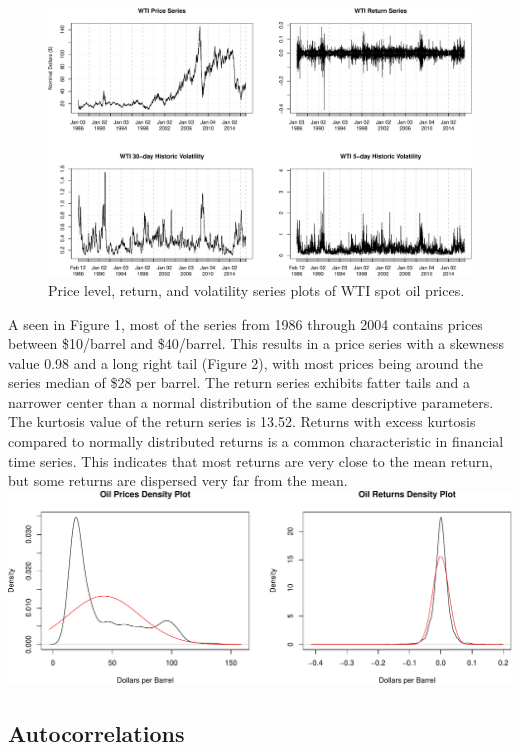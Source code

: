 \documentclass[]{article}
\begin{document}
\begin{figure}[htbp]
\centering
\includegraphics{Figs/unnamed-chunk-4-1.pdf}
\caption{Price level, return, and volatility series plots of WTI spot
oil prices.}
\end{figure}

A seen in Figure 1, most of the series from 1986 through 2004 contains
prices between \$10/barrel and \$40/barrel. This results in a price
series with a skewness value 0.98 and a long right tail (Figure 2), with
most prices being around the series median of \$28 per barrel. The
return series exhibits fatter tails and a narrower center than a normal
distribution of the same descriptive parameters. The kurtosis value of
the return series is 13.52. Returns with excess kurtosis compared to
normally distributed returns is a common characteristic in financial
time series. This indicates that most returns are very close to the mean
return, but some returns are dispersed very far from the mean.\\
\includegraphics{Figs/unnamed-chunk-5-1.pdf}

\subsection{Autocorrelations}\label{autocorrelations}
\end{document}
